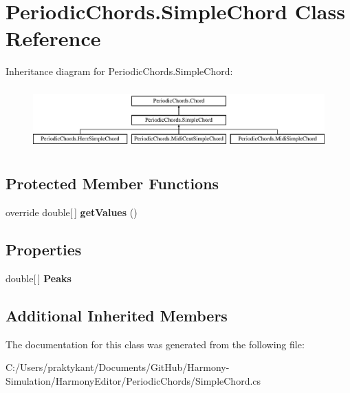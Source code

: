 \hypertarget{class_periodic_chords_1_1_simple_chord}{\section{Periodic\+Chords.\+Simple\+Chord Class Reference}
\label{class_periodic_chords_1_1_simple_chord}
}
Inheritance diagram for Periodic\+Chords.\+Simple\+Chord\+:\begin{figure}[H]
\begin{center}
\leavevmode
\includegraphics[height=2.393162cm]{class_periodic_chords_1_1_simple_chord}
\end{center}
\end{figure}
\subsection*{Protected Member Functions}
\begin{DoxyCompactItemize}
\item 
\hypertarget{class_periodic_chords_1_1_simple_chord_ad4bd98831bf186378108e76d34227f13}{override double\mbox{[}$\,$\mbox{]} {\bfseries get\+Values} ()}\label{class_periodic_chords_1_1_simple_chord_ad4bd98831bf186378108e76d34227f13}

\end{DoxyCompactItemize}
\subsection*{Properties}
\begin{DoxyCompactItemize}
\item 
\hypertarget{class_periodic_chords_1_1_simple_chord_a3cbf7fcba934e14e05106f6b6c511c30}{double\mbox{[}$\,$\mbox{]} {\bfseries Peaks}}\label{class_periodic_chords_1_1_simple_chord_a3cbf7fcba934e14e05106f6b6c511c30}

\end{DoxyCompactItemize}
\subsection*{Additional Inherited Members}


The documentation for this class was generated from the following file\+:\begin{DoxyCompactItemize}
\item 
C\+:/\+Users/praktykant/\+Documents/\+Git\+Hub/\+Harmony-\/\+Simulation/\+Harmony\+Editor/\+Periodic\+Chords/Simple\+Chord.\+cs\end{DoxyCompactItemize}
